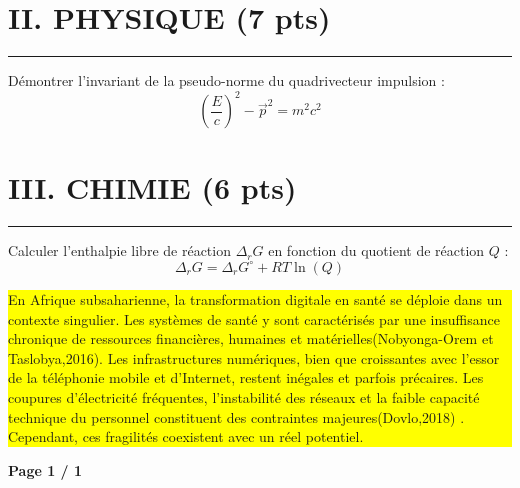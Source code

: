 \documentclass[12pt,a4paper]{article}
\begin{document}
	\section*{II. PHYSIQUE (7 pts)}
	\noindent \textcolor{red}{\rule{\textwidth}{2.5pt}}
	
	Démontrer l’invariant de la pseudo-norme du quadrivecteur impulsion :
	\[	\left(\frac{E}{c}\right)^2 - \overrightarrow{p }^2 = m^2 c^2	\]
	
	\vspace{0.5cm}
	\section*{III. CHIMIE (6 pts)}
	\noindent \textcolor{green}{\rule{\textwidth}{2.5pt}}
	
	Calculer l’enthalpie libre de réaction $\Delta_r G$ en fonction du quotient de réaction $Q$ :
	\[	\Delta_r G = \Delta_r G^\circ + RT \ln(Q)	\]
	
	\vspace{1cm}
	
	\noindent
	\colorbox{yellow}{
		\parbox{\textwidth}{
			En Afrique subsaharienne, la transformation digitale en santé se déploie dans un contexte singulier. Les systèmes de santé y sont caractérisés par une insuffisance chronique de ressources financières, humaines et matérielles(Nobyonga-Orem et Taslobya,2016). Les infrastructures numériques, bien que croissantes avec l’essor de la téléphonie mobile et d’Internet, restent inégales et parfois précaires. Les coupures d’électricité fréquentes, l’instabilité des réseaux et la faible capacité technique du personnel constituent des contraintes majeures(Dovlo,2018) . Cependant, ces fragilités coexistent avec un réel potentiel.
		}
	}
	
	\vspace{1cm}
	
	\begin{flushright}
		\textbf{Page 1 / 1}
	\end{flushright}
	

	
\end{document}
